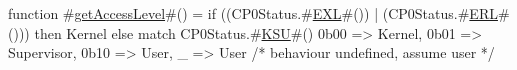 function #\hyperref[zgetAccessLevel]{getAccessLevel}#() =
  if ((CP0Status.#\hyperref[zEXL]{EXL}#()) | (CP0Status.#\hyperref[zERL]{ERL}#())) then
    Kernel
  else match CP0Status.#\hyperref[zKSU]{KSU}#()
    {
      0b00  => Kernel,
      0b01  => Supervisor,
      0b10  => User,
      _     => User /* behaviour undefined, assume user */
    }
